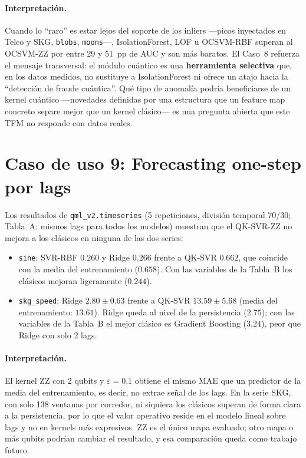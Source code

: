 \paragraph{Interpretación.}
Cuando lo ``raro'' es estar lejos del soporte de los inliers ---picos inyectados en Telco y SKG, \texttt{blobs}, \texttt{moons}---, IsolationForest, LOF u OCSVM-RBF superan al OCSVM-ZZ por entre 29 y 51~pp de AUC y son más baratos. El Caso~8 refuerza el mensaje transversal: el módulo cuántico es una \textbf{herramienta selectiva} que, en los datos medidos, no sustituye a IsolationForest ni ofrece un atajo hacia la ``detección de fraude cuántica''. Qué tipo de anomalía podría beneficiarse de un kernel cuántico ---novedades definidas por una estructura que un feature map concreto separe mejor que un kernel clásico--- es una pregunta abierta que este TFM no responde con datos reales.

\section{Caso de uso 9: Forecasting one-step por lags}
\label{sec:eval_timeseries}

Los resultados de \texttt{qml\_v2.timeseries} (5 repeticiones, división temporal 70/30; Tabla~A: mismos lags para todos los modelos) muestran que el QK-SVR-ZZ no mejora a los clásicos en ninguna de las dos series:

\begin{itemize}
  \item \texttt{sine}: SVR-RBF $0.260$ y Ridge $0.266$ frente a QK-SVR $0.662$, que coincide con la media del entrenamiento ($0.658$). Con las variables de la Tabla~B los clásicos mejoran ligeramente ($0.244$).
  \item \texttt{skg\_speed}: Ridge $2.80\pm0.63$ frente a QK-SVR $13.59\pm5.68$ (media del entrenamiento: $13.61$). Ridge queda al nivel de la persistencia ($2.75$); con las variables de la Tabla~B el mejor clásico es Gradient Boosting ($3.24$), peor que Ridge con solo 2 lags.
\end{itemize}

\paragraph{Interpretación.}
El kernel ZZ con 2 qubits y $\varepsilon=0.1$ obtiene el mismo MAE que un predictor de la media del entrenamiento, es decir, no extrae señal de los lags. En la serie SKG, con solo 138 ventanas por corredor, ni siquiera los clásicos superan de forma clara a la persistencia, por lo que el valor operativo reside en el modelo lineal sobre lags y no en kernels más expresivos. ZZ es el único mapa evaluado; otro mapa o más qubits podrían cambiar el resultado, y esa comparación queda como trabajo futuro.

